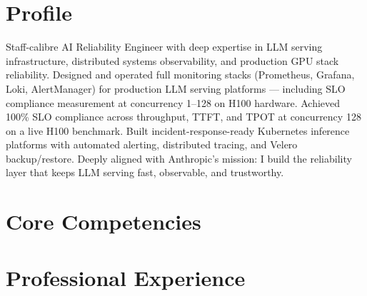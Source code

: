 \documentclass[11pt,a4paper]{moderncv}
\begin{document}
\makecvtitle

\section{Profile}
Staff-calibre AI Reliability Engineer with deep expertise in LLM serving infrastructure, distributed systems observability, and production GPU stack reliability. Designed and operated full monitoring stacks (Prometheus, Grafana, Loki, AlertManager) for production LLM serving platforms — including SLO compliance measurement at concurrency 1--128 on H100 hardware. Achieved 100\% SLO compliance across throughput, TTFT, and TPOT at concurrency 128 on a live H100 benchmark. Built incident-response-ready Kubernetes inference platforms with automated alerting, distributed tracing, and Velero backup/restore. Deeply aligned with Anthropic's mission: I build the reliability layer that keeps LLM serving fast, observable, and trustworthy.

\section{Core Competencies}

\section{Professional Experience}
\end{document}
